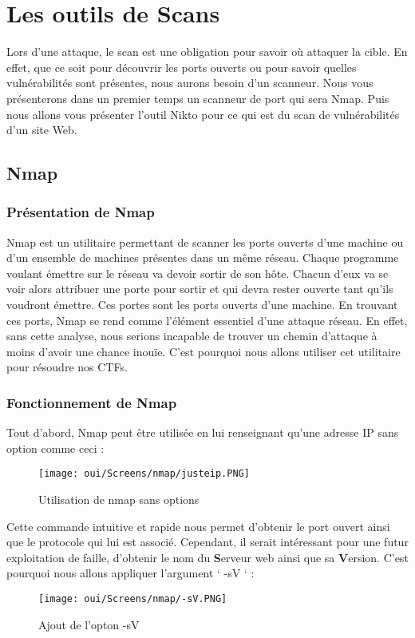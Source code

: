 \chapter{Les outils de Scans}
\label{chap:BDD}

Lors d'une attaque, le scan est une obligation pour savoir où attaquer la cible. En effet, que ce soit pour découvrir les ports ouverts ou pour savoir quelles vulnérabilités sont présentes, nous aurons besoin d'un scanneur. Nous vous présenterons dans un premier temps un scanneur de port qui sera Nmap. Puis nous allons vous présenter l'outil Nikto pour ce qui est du scan de vulnérabilités d'un site Web.

\section{Nmap}
\subsection{Présentation de Nmap}
Nmap est un utilitaire permettant de scanner les ports ouverts d’une machine ou d’un ensemble de machines présentes dans un même réseau. Chaque programme voulant émettre sur le réseau va devoir sortir de son hôte. Chacun d’eux va se voir alors attribuer une porte pour sortir et qui devra rester ouverte tant qu’ils voudront émettre. Ces portes sont les ports ouverts d’une machine. En trouvant ces ports, Nmap se rend comme l’élément essentiel d’une attaque réseau. En effet, sans cette analyse, nous serions incapable de trouver un chemin d’attaque à moins d’avoir une chance inouïe. C’est pourquoi nous allons utiliser cet utilitaire pour résoudre nos CTFs.



\subsection{Fonctionnement de Nmap}
Tout d’abord, Nmap peut être utilisée en lui renseignant qu’une adresse IP sans option comme ceci :
\begin{figure}[htp!]
  \centering
  \setlength\figureheight{7cm}
  \setlength\figurewidth{9cm}
  \texttt{[image: oui/Screens/nmap/justeip.PNG]}
  \caption{Utilisation de nmap sans options}
  \label{fig:courbe-tikz}
\end{figure}

\newpage
Cette commande intuitive et rapide nous permet d’obtenir le port ouvert ainsi que le protocole qui lui est associé. Cependant, il serait intéressant pour une futur exploitation de faille, d’obtenir le nom du \textbf{S}erveur web ainsi que sa \textbf{V}ersion. C’est pourquoi nous allons appliquer l’argument ‘ -sV ‘ :
\begin{figure}[htp!]
  \centering
  \setlength\figureheight{7cm}
  \setlength\figurewidth{9cm}
  \texttt{[image: oui/Screens/nmap/-sV.PNG]}
  \caption{Ajout de l'opton -sV}
  \label{fig:courbe-tikz}
\end{figure}

